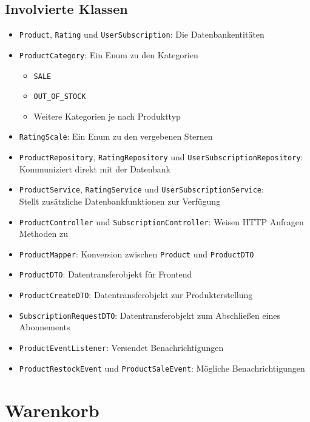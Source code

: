 \documentclass[12pt, a4paper]{scrreprt}
\begin{document}
	
		\section{Involvierte Klassen}
		
		\begin{itemize}
			\item \texttt{Product}, \texttt{Rating} und \texttt{UserSubscription}: Die Datenbankentitäten
			\item \texttt{ProductCategory}: Ein Enum zu den Kategorien
			\begin{itemize}
				\item \texttt{SALE}
				\item \texttt{OUT\_OF\_STOCK}			
				\item Weitere Kategorien je nach Produkttyp
			\end{itemize}
			\item \texttt{RatingScale}: Ein Enum zu den vergebenen Sternen
			\item \texttt{ProductRepository}, \texttt{RatingRepository} und \texttt{UserSubscriptionRepository}: Kommuniziert direkt mit der Datenbank
			\item \texttt{ProductService},  \texttt{RatingService} und \texttt{UserSubscriptionService}:\\ Stellt zusätzliche Datenbankfunktionen zur Verfügung
			\item \texttt{ProductController} und \texttt{SubscriptionController}: Weisen HTTP Anfragen Methoden zu
			\item \texttt{ProductMapper}: Konversion zwischen \texttt{Product} und \texttt{ProductDTO}
			\item \texttt{ProductDTO}: Datentransferobjekt für Frontend
			\item \texttt{ProductCreateDTO}: Datentransferobjekt zur Produkterstellung
			\item \texttt{SubscriptionRequestDTO}: Datentransferobjekt zum Abschließen eines Abonnements
			\item \texttt{ProductEventListener}: Versendet Benachrichtigungen
			\item \texttt{ProductRestockEvent} und \texttt{ProductSaleEvent}: Mögliche Benachrichtigungen
		\end{itemize}
		
	\chapter{Warenkorb}
	
\end{document}
